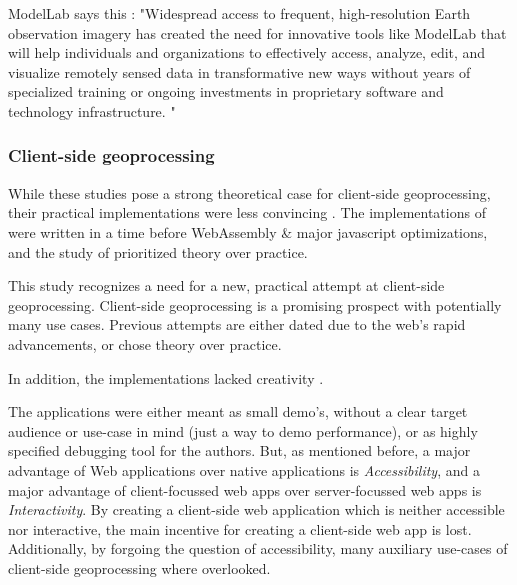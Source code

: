 ModelLab says this : "Widespread access to frequent, high-resolution Earth observation imagery has created the need for innovative tools like ModelLab that will help individuals and organizations to effectively access, analyze, edit, and visualize remotely sensed data in transformative new ways without years of specialized training or ongoing investments in proprietary software and technology infrastructure. "



\subsubsection*{Client-side geoprocessing}


While these studies pose a strong theoretical case for client-side geoprocessing, their practical implementations were less convincing . 
The implementations of \cite{panidi_hybrid_2015, hamilton_client-side_2014} were written in a time before WebAssembly \& major javascript optimizations, and the study of \cite{kulawiak_analysis_2019} prioritized theory over practice. 


This study recognizes a need for a new, practical attempt at client-side geoprocessing. 
Client-side geoprocessing is a promising prospect with potentially many use cases.
Previous attempts are either dated due to the web's rapid advancements, or chose theory over practice.

In addition, the implementations lacked creativity . 

The applications were either meant as small demo's, without a clear target audience or use-case in mind (just a way to demo performance), or as highly specified debugging tool for the authors.   
But, as mentioned before, a major advantage of Web applications over native applications is \emph{Accessibility}, and a major advantage of client-focussed web apps over server-focussed web apps is \emph{Interactivity}. 
By creating a client-side web application which is neither accessible nor interactive, the main incentive for creating a client-side web app is lost.
Additionally, by forgoing the question of accessibility, many auxiliary use-cases of client-side geoprocessing where overlooked.

